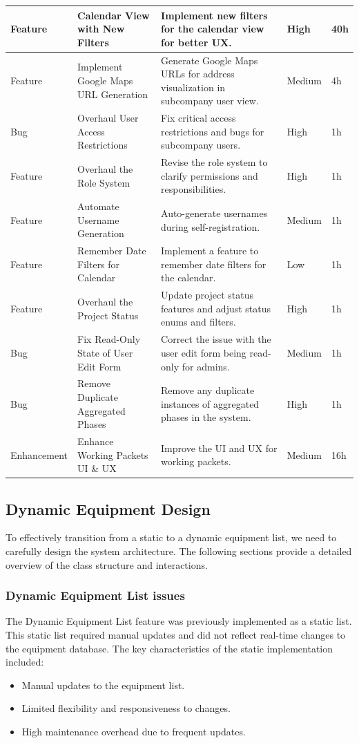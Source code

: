 \begin{longtable}{ | m{} | m{} | m{} | m{} | m{} | }
    \hline
    Feature & Calendar View with New Filters & Implement new filters for the calendar view for better UX. & High & 40h \\
    \hline
    Feature & Implement Google Maps URL Generation & Generate Google Maps URLs for address visualization in subcompany user view. & Medium & 4h \\
    \hline
    Bug & Overhaul User Access Restrictions & Fix critical access restrictions and bugs for subcompany users. & High & 1h \\
    \hline
    \rowcolor{blue!20} 
    Feature & Overhaul the Role System & Revise the role system to clarify permissions and responsibilities. & High & 1h \\
    \hline
    Feature & Automate Username Generation & Auto-generate usernames during self-registration. & Medium & 1h \\
    \hline
    Feature & Remember Date Filters for Calendar & Implement a feature to remember date filters for the calendar. & Low & 1h \\
    \hline
    Feature & Overhaul the Project Status & Update project status features and adjust status enums and filters. & High & 1h \\
    \hline
    Bug & Fix Read-Only State of User Edit Form & Correct the issue with the user edit form being read-only for admins. & Medium & 1h \\
    \hline
    Bug & Remove Duplicate Aggregated Phases & Remove any duplicate instances of aggregated phases in the system. & High & 1h \\
    \hline
    \rowcolor{blue!20} Enhancement & Enhance Working Packets UI \& UX & Improve the UI and UX for working packets. & Medium & 16h \\
    \hline
\end{longtable}

\subsection{Dynamic Equipment Design}
To effectively transition from a static to a dynamic equipment list, we need to carefully design the system architecture. The following sections provide a detailed overview of the class structure and interactions.
\subsubsection{Dynamic Equipment List issues}
The Dynamic Equipment List feature was previously implemented as a static list. This static list required manual updates and did not reflect real-time changes to the equipment database. The key characteristics of the static implementation included:
\begin{itemize}
    \item Manual updates to the equipment list.
    \item Limited flexibility and responsiveness to changes.
    \item High maintenance overhead due to frequent updates.
\end{itemize}

